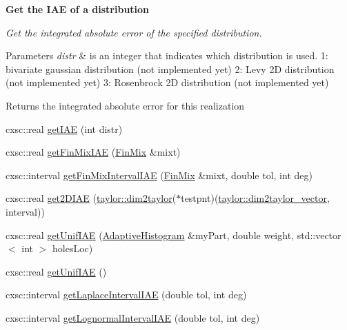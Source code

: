 \begin{Indent}{\bf \-Get the \-I\-A\-E of a distribution}\par
{\em \-Get the integrated absolute error of the specified distribution. 
\begin{DoxyParams}{\-Parameters}
{\em distr} & is an integer that indicates which distribution is used. 1\-: bivariate gaussian distribution (not implemented yet) 2\-: \-Levy 2\-D distribution (not implemented yet) 3\-: \-Rosenbrock 2\-D distribution (not implemented yet) \\
\hline
\end{DoxyParams}
\begin{DoxyReturn}{\-Returns}
the integrated absolute error for this realization 
\end{DoxyReturn}
}\begin{DoxyCompactItemize}
\item 
cxsc\-::real \hyperlink{classsubpavings_1_1AdaptiveHistogram_a28b0435b5ee65b27b2459d3dc3fc224d}{get\-I\-A\-E} (int distr)
\item 
cxsc\-::real \hyperlink{classsubpavings_1_1AdaptiveHistogram_a368e5e9ed8cf0a3e82b30291c4a54d24}{get\-Fin\-Mix\-I\-A\-E} (\hyperlink{structFinMix}{\-Fin\-Mix} \&mixt)
\item 
cxsc\-::interval \hyperlink{classsubpavings_1_1AdaptiveHistogram_abf4e34e57ff3c76828457efaecbf4510}{get\-Fin\-Mix\-Interval\-I\-A\-E} (\hyperlink{structFinMix}{\-Fin\-Mix} \&mixt, double tol, int deg)
\item 
cxsc\-::real \hyperlink{classsubpavings_1_1AdaptiveHistogram_a2b0b0c19870f67a07704458237cf19d0}{get2\-D\-I\-A\-E} (\hyperlink{classtaylor_1_1dim2taylor}{taylor\-::dim2taylor}($\ast$testpnt)(\hyperlink{classtaylor_1_1dim2taylor__vector}{taylor\-::dim2taylor\-\_\-vector}, interval))
\item 
cxsc\-::real \hyperlink{classsubpavings_1_1AdaptiveHistogram_af7cf1131373c3e547a23d2db624ce8cf}{get\-Unif\-I\-A\-E} (\hyperlink{classsubpavings_1_1AdaptiveHistogram}{\-Adaptive\-Histogram} \&my\-Part, double weight, std\-::vector$<$ int $>$ holes\-Loc)
\item 
cxsc\-::real \hyperlink{classsubpavings_1_1AdaptiveHistogram_a3d403e99c1c471552303b2a7fd7e7d3e}{get\-Unif\-I\-A\-E} ()
\item 
cxsc\-::interval \hyperlink{classsubpavings_1_1AdaptiveHistogram_a2427c16c05dc17a5d7ecb1e58f0d35ca}{get\-Laplace\-Interval\-I\-A\-E} (double tol, int deg)
\item 
cxsc\-::interval \hyperlink{classsubpavings_1_1AdaptiveHistogram_aa595732ddb587933a166aee6cc0877f6}{get\-Lognormal\-Interval\-I\-A\-E} (double tol, int deg)
\end{DoxyCompactItemize}
\end{Indent}
